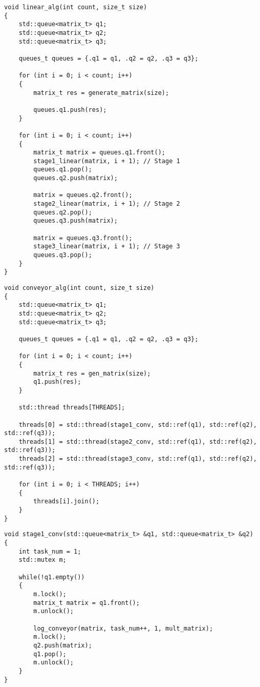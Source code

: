 \begin{lstlisting}[caption=Реализация алгоритма последовательной обработки матриц, 
    label={lin_alg}]
void linear_alg(int count, size_t size)
{
    std::queue<matrix_t> q1;
    std::queue<matrix_t> q2;
    std::queue<matrix_t> q3;

    queues_t queues = {.q1 = q1, .q2 = q2, .q3 = q3};

    for (int i = 0; i < count; i++)
    {
        matrix_t res = generate_matrix(size);

        queues.q1.push(res);
    }

    for (int i = 0; i < count; i++)
    {
        matrix_t matrix = queues.q1.front();
        stage1_linear(matrix, i + 1); // Stage 1
        queues.q1.pop();
        queues.q2.push(matrix);

        matrix = queues.q2.front();
        stage2_linear(matrix, i + 1); // Stage 2
        queues.q2.pop();
        queues.q3.push(matrix);

        matrix = queues.q3.front();
        stage3_linear(matrix, i + 1); // Stage 3
        queues.q3.pop();
    }
}
\end{lstlisting}


\begin{lstlisting}[caption=Реализация алгоритма конвейерной обработки матриц,
    label={conv_alg}]
void conveyor_alg(int count, size_t size)
{
    std::queue<matrix_t> q1;
    std::queue<matrix_t> q2;
    std::queue<matrix_t> q3;

    queues_t queues = {.q1 = q1, .q2 = q2, .q3 = q3};

    for (int i = 0; i < count; i++)
    {
        matrix_t res = gen_matrix(size);
        q1.push(res);
    }

    std::thread threads[THREADS];

    threads[0] = std::thread(stage1_conv, std::ref(q1), std::ref(q2), std::ref(q3));
    threads[1] = std::thread(stage2_conv, std::ref(q1), std::ref(q2), std::ref(q3));
    threads[2] = std::thread(stage3_conv, std::ref(q1), std::ref(q2), std::ref(q3));

    for (int i = 0; i < THREADS; i++)
    {
        threads[i].join();
    }
}
\end{lstlisting}

\begin{lstlisting}[caption=Реализация алгоритма конвейерной обработки матриц (1-ый поток),
	label={st1}]
void stage1_conv(std::queue<matrix_t> &q1, std::queue<matrix_t> &q2)
{
    int task_num = 1;
    std::mutex m;

    while(!q1.empty())
    {
        m.lock();
        matrix_t matrix = q1.front();
        m.unlock();

        log_conveyor(matrix, task_num++, 1, mult_matrix);
        m.lock();
        q2.push(matrix);
        q1.pop();
        m.unlock();
    }
}
\end{lstlisting}

